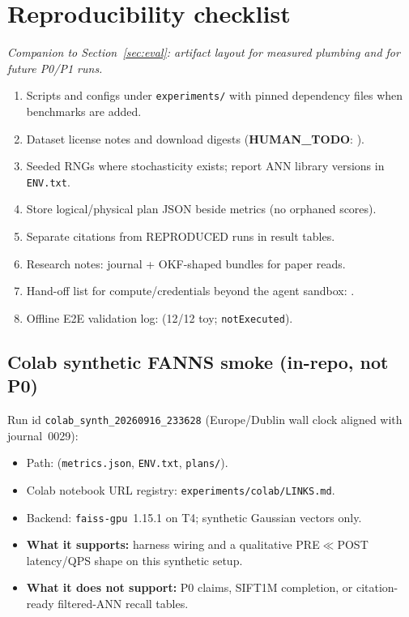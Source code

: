 \section{Reproducibility checklist}
\label{sec:repro}

\noindent\textit{Companion to Section~\ref{sec:eval}: artifact layout for measured plumbing and for future P0/P1 runs.}

\begin{enumerate}[leftmargin=*]
  \item Scripts and configs under \texttt{experiments/} with pinned dependency files when benchmarks are added.
  \item Dataset license notes and download digests (\textbf{HUMAN\_TODO}: ).
  \item Seeded RNGs where stochasticity exists; report ANN library versions in \texttt{ENV.txt}.
  \item Store logical/physical plan JSON beside metrics (no orphaned scores).
  \item Separate \authoronly{} citations from REPRODUCED runs in result tables.
  \item Research notes: journal + OKF-shaped bundles for paper reads.
  \item Hand-off list for compute/credentials beyond the agent sandbox: .
  \item Offline E2E validation log:  (12/12 toy; \texttt{notExecuted}).
\end{enumerate}

\subsection{Colab synthetic FANNS smoke (in-repo, not P0)}
\label{sec:repro-colab-synth}
Run id \texttt{colab\_synth\_20260916\_233628} (Europe/Dublin wall clock aligned with journal~0029):
\begin{itemize}[leftmargin=*]
  \item Path:  (\texttt{metrics.json}, \texttt{ENV.txt}, \texttt{plans/}).
  \item Colab notebook URL registry: \texttt{experiments/colab/LINKS.md}.
  \item Backend: \texttt{faiss-gpu}~1.15.1 on T4; synthetic Gaussian vectors only.
  \item \textbf{What it supports:} harness wiring and a qualitative PRE$\ll$POST latency/QPS shape on this synthetic setup.
  \item \textbf{What it does not support:} P0 claims, SIFT1M completion, or citation-ready filtered-ANN recall tables.
\end{itemize}




